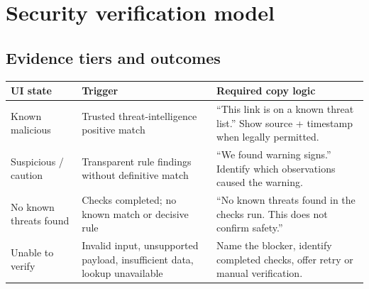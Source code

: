 \documentclass[10pt,a4paper]{article}
\begin{document}
\section{Security verification model}
\subsection{Evidence tiers and outcomes}
\begin{tabularx}{\linewidth}{@{}p{32mm}p{34mm}Y@{}}\toprule
\textbf{UI state} & \textbf{Trigger} & \textbf{Required copy logic} \\ \midrule
Known malicious & Trusted threat-intelligence positive match & ``This link is on a known threat list.'' Show source + timestamp when legally permitted. \\
Suspicious / caution & Transparent rule findings without definitive match & ``We found warning signs.'' Identify which observations caused the warning. \\
No known threats found & Checks completed; no known match or decisive rule & ``No known threats found in the checks run. This does not confirm safety.'' \\
Unable to verify & Invalid input, unsupported payload, insufficient data, lookup unavailable & Name the blocker, identify completed checks, offer retry or manual verification. \\
\bottomrule\end{tabularx}
\end{document}
